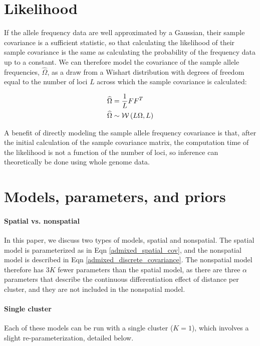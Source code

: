 \documentclass[12pt]{article}
\begin{document}
\section{Likelihood}
If the allele frequency data are well approximated by a Gaussian, 
their sample covariance is a sufficient statistic,
so that calculating the likelihood of their sample covariance is the same as 
calculating the probability of the frequency data up to a constant. 
We can therefore model the covariance of the sample allele frequencies, $\widehat{\Omega}$, 
as a draw from a Wishart distribution with degrees of freedom equal to 
the number of loci $L$ across which the sample covariance is calculated:

\begin{align}
\widehat{\Omega} &= \frac{1}{L}FF^T \notag \\
\widehat{\Omega} &\sim \mathcal{W}\left( L\Omega, L	\right)
\label{wishart}
\end{align}

A benefit of directly modeling the sample allele frequency covariance is that, 
after the initial calculation of the sample covariance matrix,
the computation time of the likelihood is not a function of the number of loci,
so inference can theoretically be done using whole genome data.

\section{Models, parameters, and priors}
\paragraph{Spatial vs. nonspatial}
In this paper, we discuss two types of models, spatial and nonspatial.
The spatial model is parameterized as in Eqn \ref{admixed_spatial_cov},
and the nonspatial model is described in Eqn \ref{admixed_discrete_covariance}.
The nonspatial model therefore has $3K$ fewer parameters than the spatial model,
as there are three $\alpha$ parameters that describe the continuous differentiation effect of distance per cluster,
and they are not included in the nonspatial model.

\paragraph{Single cluster}
Each of these models can be run with a single cluster ($K=1$), 
which involves a slight re-parameterization, detailed below.
\end{document}
